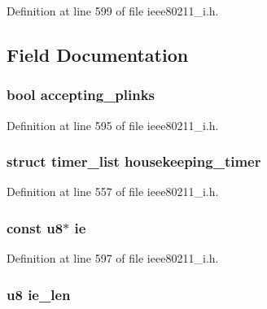 Definition at line 599 of file ieee80211\-\_\-i.\-h.



\subsection{Field Documentation}
\hypertarget{structieee80211__if__mesh_a27b3535c857149e70e4b9c973719ad7b}{
\subsubsection[{accepting\-\_\-plinks}]{\setlength{\rightskip}{0pt plus 5cm}bool accepting\-\_\-plinks}}\label{structieee80211__if__mesh_a27b3535c857149e70e4b9c973719ad7b}


Definition at line 595 of file ieee80211\-\_\-i.\-h.

\hypertarget{structieee80211__if__mesh_aedaac0553091bd2ddcc6d928973785d7}{
\subsubsection[{housekeeping\-\_\-timer}]{\setlength{\rightskip}{0pt plus 5cm}struct timer\-\_\-list housekeeping\-\_\-timer}}\label{structieee80211__if__mesh_aedaac0553091bd2ddcc6d928973785d7}


Definition at line 557 of file ieee80211\-\_\-i.\-h.

\hypertarget{structieee80211__if__mesh_a74b4af5de0da224d9fb8b59a3aec207e}{
\subsubsection[{ie}]{\setlength{\rightskip}{0pt plus 5cm}const u8$\ast$ ie}}\label{structieee80211__if__mesh_a74b4af5de0da224d9fb8b59a3aec207e}


Definition at line 597 of file ieee80211\-\_\-i.\-h.

\hypertarget{structieee80211__if__mesh_a8e143706c80e5faf90dc4a385c4517f6}{
\subsubsection[{ie\-\_\-len}]{\setlength{\rightskip}{0pt plus 5cm}u8 ie\-\_\-len}}\label{structieee80211__if__mesh_a8e143706c80e5faf90dc4a385c4517f6}


